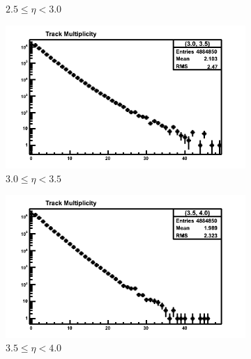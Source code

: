 \begin{figure}[h]
\begin{subfigure}[h]{0.32\textwidth}
		\caption{$2.5 \le \eta < 3.0$}
		\label{fig: reconstructed track multiplicity measured down 2.5 - 3.0}
	\end{subfigure}
	\begin{subfigure}[h]{0.32\textwidth}
		\includegraphics[width=\textwidth]{./Chapters/multiplicity/images/reconstructed_multiplicity_3_0_3_5_real_down.png}
		\caption{$3.0 \le \eta < 3.5$}
		\label{fig: reconstructed track multiplicity measured down 3.0 - 3.5}
	\end{subfigure}
	\begin{subfigure}[h]{0.32\textwidth}
		\includegraphics[width=\textwidth]{./Chapters/multiplicity/images/reconstructed_multiplicity_3_5_4_0_real_down.png}
		\caption{$3.5 \le \eta < 4.0$}
		\label{fig: reconstructed track multiplicity measured down 3.5 - 4.0}
	\end{subfigure}
	\begin{subfigure}[h]{0.32\textwidth}

\end{subfigure}
\end{figure}
